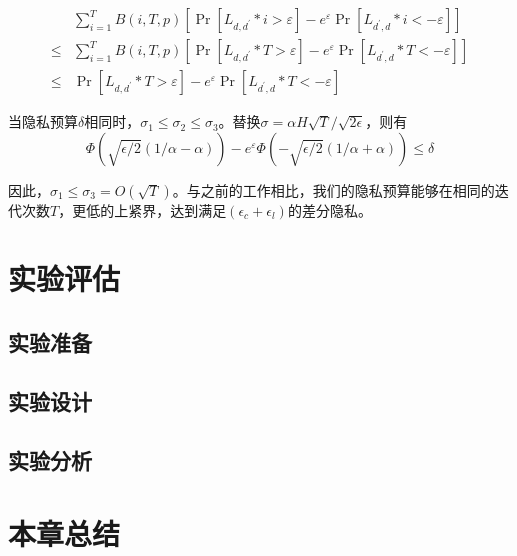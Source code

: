 \begin{equation}\label{eq:隐私预算计算3}
\begin{aligned}
& \sum_{i=1}^{T} B(i, T, p)\left[\operatorname{Pr}\left[L_{d, d^{\prime}} * i>\varepsilon\right]-e^{\varepsilon} \operatorname{Pr}\left[L_{d^{\prime}, d} * i<-\varepsilon\right]\right] \\
\leq & \sum_{i=1}^{T} B(i, T, p)\left[\operatorname{Pr}\left[L_{d, d^{\prime}} * T>\varepsilon\right]-e^{\varepsilon} \operatorname{Pr}\left[L_{d^{\prime}, d} * T<-\varepsilon\right]\right] \\
\leq & \operatorname{Pr}\left[L_{d, d^{\prime}} * T>\varepsilon\right]-e^{\varepsilon} \operatorname{Pr}\left[L_{d^{\prime}, d} * T<-\varepsilon\right]
\end{aligned}
\end{equation}

当隐私预算$\delta$相同时，$\sigma_{1} \leq \sigma_{2} \leq \sigma_{3}$。替换$\sigma=\alpha H \sqrt{T} / \sqrt{2 \epsilon}$，则有
\begin{equation}\label{eq:隐私预算计算4}
\Phi(\sqrt{\epsilon / 2}(1 / \alpha-\alpha))-e^{\varepsilon} \Phi(-\sqrt{\epsilon / 2}(1 / \alpha+\alpha)) \leq \delta
\end{equation}

因此，$\sigma_{1} \leq \sigma_{3}=O(\sqrt{T})$。与之前的工作相比，我们的隐私预算能够在相同的迭代次数$T$，更低的上紧界，达到满足$\left(\epsilon_{c}+\epsilon_{l}\right)$的差分隐私。

\section{实验评估}

\subsection{实验准备}


\subsection{实验设计}

\subsection{实验分析}

\section{本章总结}


